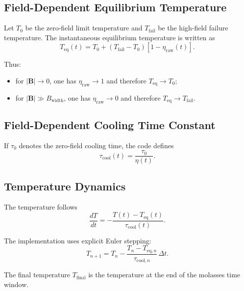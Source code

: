 \documentclass[12pt,a4paper]{article}
\begin{document}
\subsection{Field-Dependent Equilibrium Temperature}

Let $T_0$ be the zero-field limit temperature and $T_{\mathrm{fail}}$ be the high-field failure temperature. The instantaneous equilibrium temperature is written as
\begin{equation}
  T_{\mathrm{eq}}(t)
  =
  T_0 + \left(T_{\mathrm{fail}}-T_0\right)\left[1-\eta_{\mathrm{raw}}(t)\right].
\end{equation}

Thus:
\begin{itemize}
  \item for $|\bm{B}| \to 0$, one has $\eta_{\mathrm{raw}} \to 1$ and therefore $T_{\mathrm{eq}} \to T_0$;
  \item for $|\bm{B}| \gg B_{\mathrm{width}}$, one has $\eta_{\mathrm{raw}} \to 0$ and therefore $T_{\mathrm{eq}} \to T_{\mathrm{fail}}$.
\end{itemize}

\subsection{Field-Dependent Cooling Time Constant}

If $\tau_0$ denotes the zero-field cooling time, the code defines
\begin{equation}
  \tau_{\mathrm{cool}}(t) = \frac{\tau_0}{\eta(t)}.
\end{equation}

\subsection{Temperature Dynamics}

The temperature follows
\begin{equation}
  \frac{dT}{dt}
  =
  -\frac{T(t)-T_{\mathrm{eq}}(t)}{\tau_{\mathrm{cool}}(t)}.
\end{equation}

The implementation uses explicit Euler stepping:
\begin{equation}
  T_{n+1}
  =
  T_n
  -
  \frac{T_n-T_{\mathrm{eq},n}}{\tau_{\mathrm{cool},n}}\,\Delta t.
\end{equation}

The final temperature $T_{\mathrm{final}}$ is the temperature at the end of the molasses time window.
\end{document}
